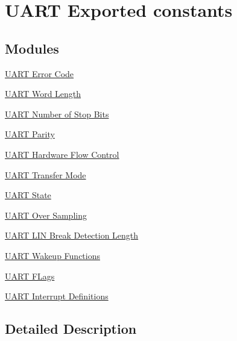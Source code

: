 \hypertarget{group___u_a_r_t___exported___constants}{}\section{U\+A\+RT Exported constants}
\label{group___u_a_r_t___exported___constants}
\subsection*{Modules}
\begin{DoxyCompactItemize}
\item 
\hyperlink{group___u_a_r_t___error___code}{U\+A\+R\+T Error Code}
\item 
\hyperlink{group___u_a_r_t___word___length}{U\+A\+R\+T Word Length}
\item 
\hyperlink{group___u_a_r_t___stop___bits}{U\+A\+R\+T Number of Stop Bits}
\item 
\hyperlink{group___u_a_r_t___parity}{U\+A\+R\+T Parity}
\item 
\hyperlink{group___u_a_r_t___hardware___flow___control}{U\+A\+R\+T Hardware Flow Control}
\item 
\hyperlink{group___u_a_r_t___mode}{U\+A\+R\+T Transfer Mode}
\item 
\hyperlink{group___u_a_r_t___state}{U\+A\+R\+T State}
\item 
\hyperlink{group___u_a_r_t___over___sampling}{U\+A\+R\+T Over Sampling}
\item 
\hyperlink{group___u_a_r_t___l_i_n___break___detection___length}{U\+A\+R\+T L\+I\+N Break Detection Length}
\item 
\hyperlink{group___u_a_r_t___wake_up__functions}{U\+A\+R\+T Wakeup Functions}
\item 
\hyperlink{group___u_a_r_t___flags}{U\+A\+R\+T F\+Lags}
\item 
\hyperlink{group___u_a_r_t___interrupt__definition}{U\+A\+R\+T Interrupt Definitions}
\end{DoxyCompactItemize}


\subsection{Detailed Description}
